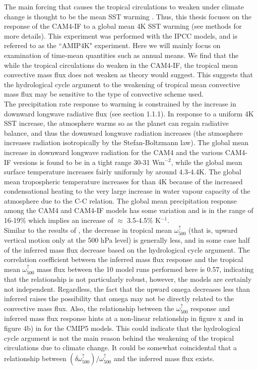 \documentclass[letterpaper,12pt,titlepage,oneside,final]{book}
\begin{document}
The main forcing that causes the tropical circulations to weaken under climate change is thought to be the mean SST warming \citep{he_anthropogenic_2015}. Thus, this thesis focuses on the response of the CAM4-IF to a global mean 4K SST warming (see methods for more details). This experiment was performed with the IPCC models, and is referred to as the ``AMIP4K" experiment. Here we will mainly focus on examination of time-mean quantities such as annual means. We find that the while the tropical circulations do weaken in the CAM4-IF, the tropical mean convective mass flux does not weaken as theory would suggest. This suggests that the hydrological cycle argument to the weakening of tropical mean convective mass flux may be sensitive to the type of convective scheme used.
\\
The precipitation rate response to warming is constrained by the increase in downward longwave radiative flux (see section 1.1.1). In response to a uniform 4K SST increase, the atmosphere warms so as the planet can regain radiative balance, and thus the downward longwave radiation increases (the atmosphere increases radiation isotropically by the Stefan-Boltzmann law). The global mean increase in downward longwave radiation for the CAM4 and the various CAM4-IF versions is found to be in a tight range 30-31 Wm$^{-2}$, while the global mean surface temperature increases fairly uniformly by around 4.3-4.4K. The global mean tropospheric temperature increases for than 4K because of the increased condensational heating to the very large increase in water vapour capacity of the atmosphere due to the C-C relation. The global mean precipitation response among the CAM4 and CAM4-IF models has some variation and is in the range of 16-19\% which implies an increase of $\approx$ 3.5-4.5\% K$^{-1}$.
\\
Similar to the results of \citep{vecchi_global_2007}, the decrease in tropical mean $\omega_{500}^{\uparrow}$ (that is, upward vertical motion only at the 500 hPa level) is generally less, and in some case half of the inferred mass flux decrease based on the hydrological cycle argument. The correlation coefficient between the inferred mass flux response and the tropical mean $\omega_{500}^{\uparrow}$ mass flux between the 10 model runs performed here is 0.57, indicating that the relationship is not particularly robust, however, the models are certainly not independent. Regardless, the fact that the upward omega decreases less than inferred raises the possibility that omega may not be directly related to the convective mass flux. Also, the relationship between the $\omega_{500}^{\uparrow}$ response and inferred mass flux response hints at a non-linear relationship in figure x and in figure 4b) in \citep{vecchi_global_2007} for the CMIP5 models. This could indicate that the hydrological cycle argument is not the main reason behind the weakening of the tropical circulations due to climate change. It could be somewhat coincidental that a relationship between $(\delta{\omega_{500}^{\uparrow}})/\omega_{500}^{\uparrow}$ and the inferred mass flux exists.
\end{document}
